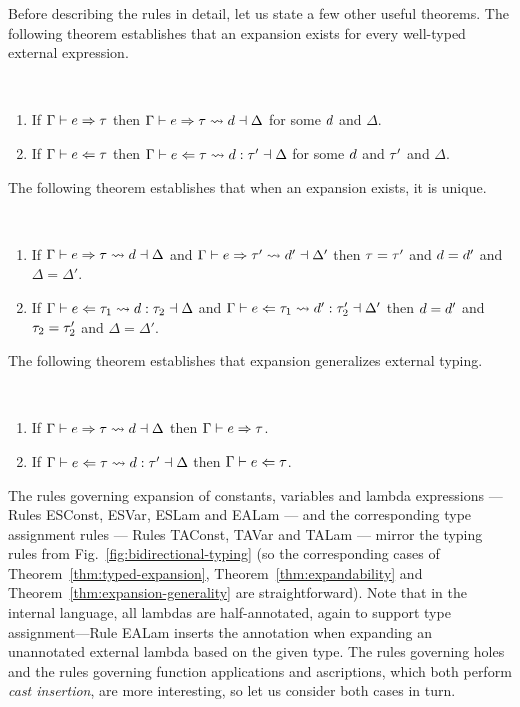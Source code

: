 Before describing the rules in detail, let us state a few other useful theorems. 
The following theorem establishes that an expansion exists for every well-typed external expression.
 \begin{thm}[Expandability] \label{thm:expandability}~
  \begin{enumerate}[nolistsep]
    \item
      If $\Gamma \vdash e \Rightarrow \tau$
      then $\Gamma \vdash e \Rightarrow \tau \leadsto d \dashv \Delta$
      for some $d$ and $\Delta$.
    \item
      If $\Gamma \vdash e \Leftarrow \tau$
      then $\Gamma \vdash e \Leftarrow \tau \leadsto d : \tau' \dashv \Delta$
      for some $d$ and $\tau'$ and $\Delta$.
  \end{enumerate}
\end{thm}
\noindent
The following theorem establishes that when an expansion exists, it is unique.
\begin{thm} \label{thm:expansion-unicity}~
  \begin{enumerate}[nolistsep]
    \item
      If $\Gamma \vdash e \Rightarrow \tau \leadsto d \dashv \Delta$
      and $\Gamma \vdash e \Rightarrow \tau' \leadsto d' \dashv \Delta'$
      then $\tau=\tau'$ and $d=d'$ and $\Delta=\Delta'$.
    \item
      If $\Gamma \vdash e \Leftarrow \tau_1 \leadsto d : \tau_2 \dashv \Delta$
      and $\Gamma \vdash e \Leftarrow \tau_1 \leadsto d' : \tau_2' \dashv \Delta'$
      then $d=d'$ and $\tau_2=\tau_2'$ and $\Delta=\Delta'$.
  \end{enumerate}
\end{thm}
\noindent
The following theorem establishes that expansion generalizes external typing.
\begin{thm} \label{thm:expansion-generality}~
  \begin{enumerate}[nolistsep]
    \item
      If $\Gamma \vdash e \Rightarrow \tau \leadsto d \dashv \Delta$
      then $\Gamma \vdash e \Rightarrow \tau$.
    \item
      If $\Gamma \vdash e \Leftarrow \tau \leadsto d : \tau' \dashv \Delta$
      then $\Gamma \vdash e \Leftarrow \tau$.
  \end{enumerate}
\end{thm}

The rules governing expansion of constants, variables and lambda expressions --- Rules {ESConst}, {ESVar}, {ESLam} and {EALam} --- and the corresponding type assignment rules --- Rules {TAConst}, {TAVar} and {TALam} --- mirror the typing rules from Fig.~\ref{fig:bidirectional-typing} 
(so the corresponding cases of Theorem~\ref{thm:typed-expansion}, Theorem~\ref{thm:expandability} and Theorem~\ref{thm:expansion-generality} are straightforward). 
Note that in the internal language, all lambdas are half-annotated, again to support type assignment---Rule {EALam} inserts the annotation when expanding an unannotated external lambda based on the given type. 
The rules governing holes and the rules governing function applications and ascriptions, which both perform \emph{cast insertion}, are more interesting, so let us consider both cases in turn.

